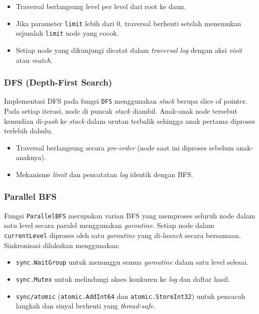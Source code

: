 \begin{itemize}
    \item Traversal berlangsung level per level dari root ke daun.
    \item Jika parameter \texttt{limit} lebih dari 0, traversal berhenti setelah menemukan sejumlah \texttt{limit} node yang cocok.
    \item Setiap node yang dikunjungi dicatat dalam \textit{traversal log} dengan aksi \textit{visit} atau \textit{match}.
\end{itemize}

\subsubsection{DFS (Depth-First Search)}

Implementasi DFS pada fungsi \texttt{DFS} menggunakan \textit{stack} berupa slice of pointer. Pada setiap iterasi, node di puncak \textit{stack} diambil. Anak-anak node tersebut kemudian di-\textit{push} ke \textit{stack} dalam urutan terbalik sehingga anak pertama diproses terlebih dahulu.

\begin{itemize}
    \item Traversal berlangsung secara \textit{pre-order} (node saat ini diproses sebelum anak-anaknya).
    \item Mekanisme \textit{limit} dan pencatatan \textit{log} identik dengan BFS.
\end{itemize}

\subsubsection{Parallel BFS}

Fungsi \texttt{ParallelBFS} merupakan varian BFS yang memproses seluruh node dalam satu level secara paralel menggunakan \textit{goroutine}. Setiap node dalam \texttt{currentLevel} diproses oleh satu \textit{goroutine} yang di-\textit{launch} secara bersamaan. Sinkronisasi dilakukan menggunakan:

\begin{itemize}
    \item \texttt{sync.WaitGroup} untuk menunggu semua \textit{goroutine} dalam satu level selesai.
    \item \texttt{sync.Mutex} untuk melindungi akses konkuren ke \textit{log} dan daftar hasil.
    \item \texttt{sync/atomic} (\texttt{atomic.AddInt64} dan \texttt{atomic.StoreInt32}) untuk pencacah langkah dan sinyal berhenti yang \textit{thread-safe}.
\end{itemize}

